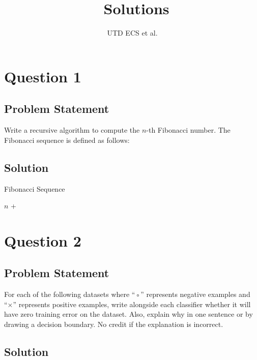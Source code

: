 \documentclass[12pt]{article}
\title{\examtitle~Solutions}
\author{UTD ECS et al.}
\begin{document}
\maketitle

\section*{Question 1}
\subsection*{Problem Statement}
Write a recursive algorithm to compute the $n$-th Fibonacci number. The Fibonacci sequence is defined as follows:

\subsection*{Solution}
\begin{algorithm}
    \caption{Fibonacci Sequence}
    \begin{algorithmic}[1]
            \State \Return $n$
        \Else
            \State \Return {} + 
        \EndIf
    \EndProcedure
    \end{algorithmic}
\end{algorithm}

\section*{Question 2}
\subsection*{Problem Statement}
For each of the following datasets where “◦” represents negative examples and “×” represents positive examples, write alongside each classifier whether it will have zero training error on the dataset. Also, explain why in one sentence or by drawing a decision boundary. No credit if the explanation is incorrect.

\subsection*{Solution}

\end{document}
